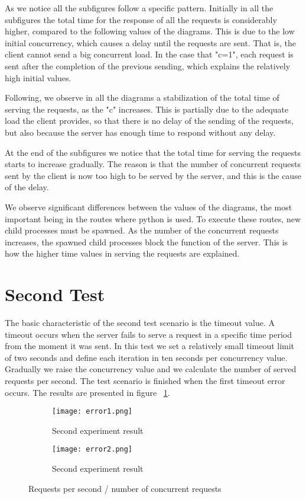 As we notice all the subfigures follow a specific pattern. Initially in all the subfigures the total time for the response of all the requests is considerably higher, compared to the following values of the diagrams. This is due to the low initial concurrency, which causes a delay until the requests are sent. That is, the client cannot send a big concurrent load. In the case that "c=1", each request is sent after the completion of the previous sending, which explains the relatively high initial values. \par 
	Following, we observe in all the diagrams a stabilization of the total time of serving the requests, as the "c" increases. This is partially due to the adequate load the client provides, so that there is no delay of the sending of the requests, but also because the server has enough time to respond without any delay. \par 
	At the end of the subfigures we notice that the total time for serving the requests starts to increase gradually. The reason is that the number of concurrent requests sent by the client is now too high to be served by the server, and this is the cause of the delay. \par 
	We observe significant differences between the values of the diagrams, the most important being in the routes where python is used. To execute these routes, new child processes must be spawned. As the number of the concurrent requests increases, the spawned child processes block the function of the server. This is how the higher time values in serving the requests are explained.  

	
\section{Second Test}
The basic characteristic of the second test scenario is the timeout value. A timeout occurs when the server fails to serve a request in a specific time period from the moment it was sent. In this test we set a relatively small timeout limit of two seconds and define each iteration in ten seconds per concurrency value. Gradually we raise the concurrency value and we calculate the number of served requests per second. The test scenario is finished when the first timeout error occurs. The results are presented in figure ~\ref{experiment_fig2}. \par 


\begin{figure}
\centering
\begin{subfigure}{1\textwidth}
  \centering
  \centerline{\texttt{[image: error1.png]}}
  \caption{Second experiment result}
\end{subfigure}
\begin{subfigure}{1\textwidth}
  \centering
  \centerline{\texttt{[image: error2.png]}}
  \caption{Second experiment result}
\end{subfigure}
\caption{Requests per second / number of concurrent requests}
\label{experiment_fig2}
\end{figure}


